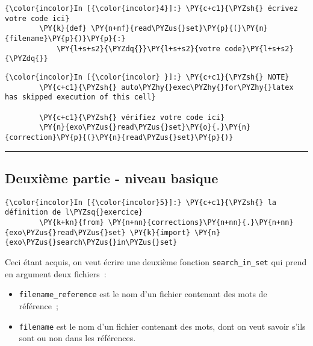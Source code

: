     \begin{Verbatim}[commandchars=\\\{\}]
{\color{incolor}In [{\color{incolor}4}]:} \PY{c+c1}{\PYZsh{} écrivez votre code ici}
        \PY{k}{def} \PY{n+nf}{read\PYZus{}set}\PY{p}{(}\PY{n}{filename}\PY{p}{)}\PY{p}{:}
            \PY{l+s+s2}{\PYZdq{}}\PY{l+s+s2}{votre code}\PY{l+s+s2}{\PYZdq{}}
\end{Verbatim}


    \begin{Verbatim}[commandchars=\\\{\}]
{\color{incolor}In [{\color{incolor} }]:} \PY{c+c1}{\PYZsh{} NOTE}
        \PY{c+c1}{\PYZsh{} auto\PYZhy{}exec\PYZhy{}for\PYZhy{}latex has skipped execution of this cell}
        
        \PY{c+c1}{\PYZsh{} vérifiez votre code ici}
        \PY{n}{exo\PYZus{}read\PYZus{}set}\PY{o}{.}\PY{n}{correction}\PY{p}{(}\PY{n}{read\PYZus{}set}\PY{p}{)}
\end{Verbatim}


    \begin{center}\rule{0.5\linewidth}{\linethickness}\end{center}

    \hypertarget{deuxiuxe8me-partie---niveau-basique}{%
\subsection{Deuxième partie - niveau
basique}\label{deuxiuxe8me-partie---niveau-basique}}

    \begin{Verbatim}[commandchars=\\\{\}]
{\color{incolor}In [{\color{incolor}5}]:} \PY{c+c1}{\PYZsh{} la définition de l\PYZsq{}exercice}
        \PY{k+kn}{from} \PY{n+nn}{corrections}\PY{n+nn}{.}\PY{n+nn}{exo\PYZus{}read\PYZus{}set} \PY{k}{import} \PY{n}{exo\PYZus{}search\PYZus{}in\PYZus{}set}
\end{Verbatim}


    Ceci étant acquis, on veut écrire une deuxième fonction
\texttt{search\_in\_set} qui prend en argument deux fichiers~:

\begin{itemize}
\tightlist
\item
  \texttt{filename\_reference} est le nom d'un fichier contenant des
  mots de référence~;
\item
  \texttt{filename} est le nom d'un fichier contenant des mots, dont on
  veut savoir s'ils sont ou non dans les références.
\end{itemize}

